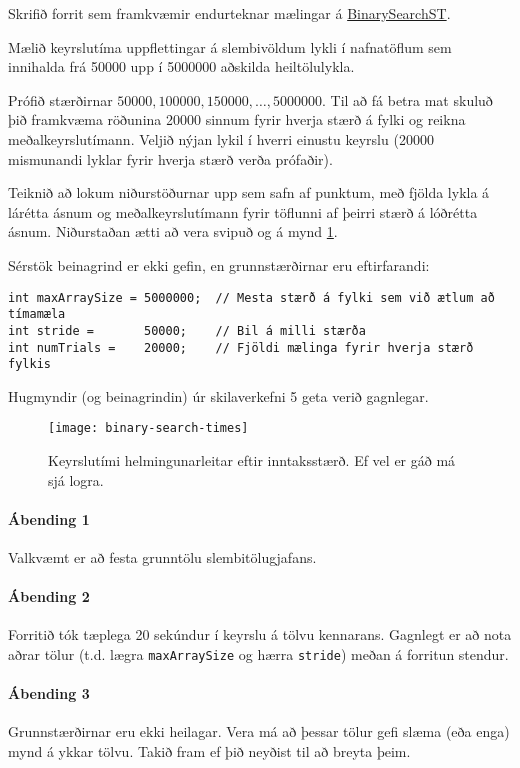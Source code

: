 \documentclass{article}
\begin{document}
Skrifið forrit sem framkvæmir endurteknar mælingar á \href{https://algs4.cs.princeton.edu/code/edu/princeton/cs/algs4/BinarySearchST.java.html}{BinarySearchST}.

Mælið keyrslutíma uppflettingar á slembivöldum lykli í nafnatöflum sem innihalda frá 50000 upp í 5000000 aðskilda heiltölulykla. 

Prófið stærðirnar $50000, 100000, 150000, \ldots , 5000000$. Til að fá betra mat skuluð þið framkvæma röðunina 20000 sinnum fyrir hverja stærð á fylki og reikna meðalkeyrslutímann. Veljið nýjan lykil í hverri einustu keyrslu (20000 mismunandi lyklar fyrir hverja stærð verða prófaðir).

Teiknið að lokum niðurstöðurnar upp sem safn af punktum, með fjölda lykla á lárétta ásnum og meðalkeyrslutímann fyrir töflunni af þeirri stærð á lóðrétta ásnum. Niðurstaðan ætti að vera svipuð og á mynd \ref{mynd:1}.

Sérstök beinagrind er ekki gefin, en grunnstærðirnar eru eftirfarandi:

\begin{verbatim}
int maxArraySize = 5000000;  // Mesta stærð á fylki sem við ætlum að tímamæla
int stride =       50000;    // Bil á milli stærða
int numTrials =    20000;    // Fjöldi mælinga fyrir hverja stærð fylkis
\end{verbatim}

Hugmyndir (og beinagrindin) úr skilaverkefni 5 geta verið gagnlegar.

\begin{figure}[h]
	\caption{Keyrslutími helmingunarleitar eftir inntaksstærð. Ef vel er gáð má sjá logra.}
	\label{mynd:1}
	\begin{center}
		\texttt{[image: binary-search-times]}
	\end{center}
\end{figure}

\paragraph{Ábending 1} Valkvæmt er að festa grunntölu slembitölugjafans.
\paragraph{Ábending 2} Forritið tók tæplega 20 sekúndur í keyrslu á tölvu kennarans. Gagnlegt er að nota aðrar tölur (t.d. lægra \texttt{maxArraySize} og hærra \texttt{stride}) meðan á forritun stendur.
\paragraph{Ábending 3} Grunnstærðirnar eru ekki heilagar. Vera má að þessar tölur gefi slæma (eða enga) mynd á ykkar tölvu. Takið fram ef þið neyðist til að breyta þeim.
\end{document}
